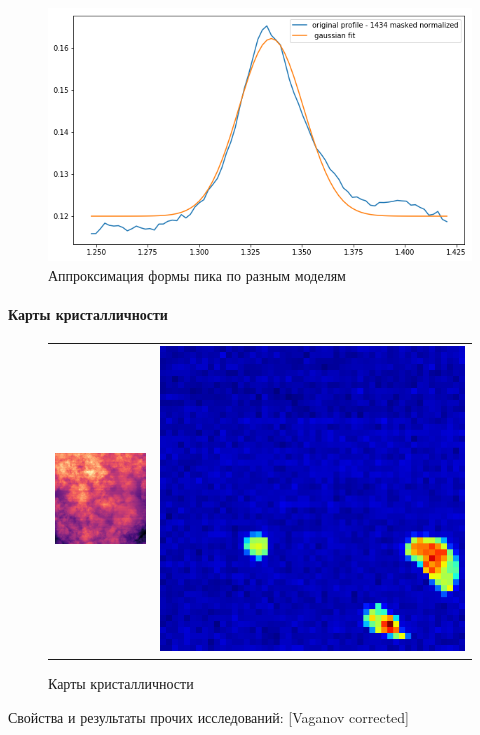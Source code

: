 \begin{figure}
    \centering
    \includegraphics[width=\linewidth]{fig/gauss-fit.png}
    \caption{Аппроксимация формы пика по разным моделям}
    \label{fig:my_label}
\end{figure}
	
	\paragraph{Карты кристалличности}
	
	\begin{figure}[ht]\center
\begin{tabular}{cc}
\includegraphics[width=0.5\linewidth]{fig/map-1.png}
&
\includegraphics[width=0.5\linewidth]{fig/map-2.png}
\end{tabular}
\caption{Карты кристалличности}
\end{figure}
	
	

	
	
	
	Свойства и результаты прочих исследований:
	[Vaganov corrected]